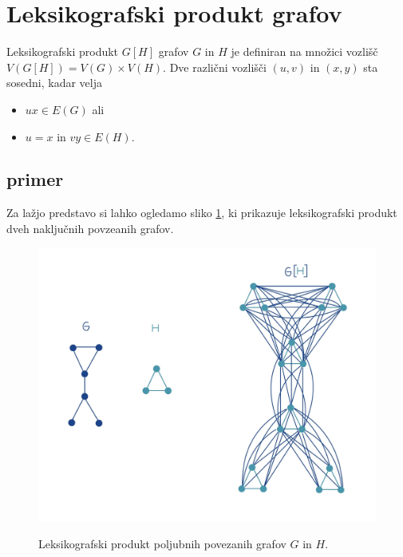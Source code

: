 \documentclass[mat1, tisk]{fmfdelo}
\newcommand{\1}{(1, 1, ..., 1)}
\newcommand{\2}{(2, 2, ..., 2)}
\begin{document}
\section{Leksikografski produkt grafov}\label{s:leks_prod}


\begin{definicija} \label{def:leks_prod}
    Leksikografski produkt $G[H]$ grafov $G$ in $H$ je definiran na množici vozlišč 
    $V (G[H]) = V (G)\times V (H)$. Dve različni vozlišči $(u, v)$ in $(x, y)$ sta 
    sosedni, kadar velja
\begin{itemize}
    \item $ux \in E(G)$ ali
    \item $u = x$ in $vy \in E(H).$ 
\end{itemize}
\end{definicija}




\subsection{primer} 
Za lažjo predstavo si lahko ogledamo sliko \ref{fig:produkt}, ki prikazuje leksikografski produkt
dveh naključnih povzeanih grafov.

\begin{figure}[h]
    \caption{Leksikografski produkt poljubnih povezanih grafov $G$ in $H$.}
    \centering
    \includegraphics[width=\textwidth]{IMG_produkt.jpg}   
    \label{fig:produkt}   
\end{figure}
\end{document}
